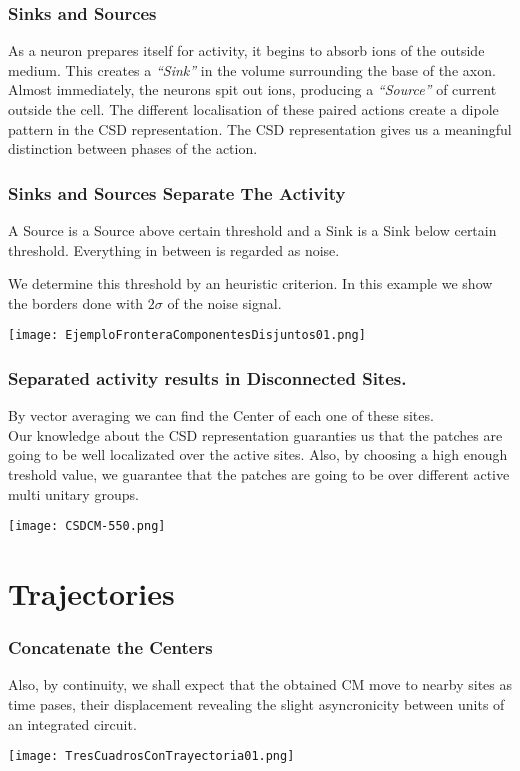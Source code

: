 \documentclass[10pt]{beamer}
\begin{document}
\begin{frame}
  \frametitle{Sinks and Sources}
  As a neuron prepares itself for activity, it begins
  to absorb  ions of the outside medium. This creates a
  \emph{``Sink''} in the volume surrounding the base of the axon.
  Almost immediately, the neurons spit out  ions, producing a
  \emph{``Source''} of current outside the cell. The different localisation
  of these paired actions create a dipole pattern in the CSD representation.
  The CSD representation gives us a meaningful distinction
  between phases of the action.
\end{frame}


\begin{frame}
  \frametitle{Sinks and Sources Separate The Activity}
  A Source is a Source above certain threshold and a
  Sink is a Sink below certain threshold. Everything
  in between is regarded as noise.

  We determine this threshold by an heuristic criterion.
  In this example we show the borders done with $2\sigma$
  of the noise signal.
  \begin{center}
    \texttt{[image: EjemploFronteraComponentesDisjuntos01.png]}
  \end{center}
  

\end{frame}

\begin{frame}
  \frametitle{Separated activity results in Disconnected Sites.}
  By vector averaging we can find the Center of each one of
  these sites.\\
  Our knowledge about the CSD representation guaranties us that
  the patches are going to be well localizated over the active sites.
  Also, by choosing a high enough treshold value, we guarantee that
  the patches are going to be over different active multi unitary groups.
  \begin{center}
    \texttt{[image: CSDCM-550.png]}
  \end{center}
  
\end{frame}

\section{Trajectories}

\begin{frame}
  \frametitle{Concatenate the Centers}
  Also, by continuity, we shall expect that the obtained CM move
  to nearby sites as time pases, their displacement revealing the
  slight asyncronicity between units of an integrated circuit.
  \begin{center}
    \texttt{[image: TresCuadrosConTrayectoria01.png]}
  \end{center}
  
\end{frame}
\end{document}
